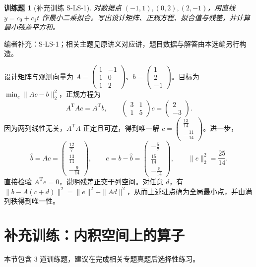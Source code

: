 \documentclass[12pt,fontset=fandol]{ctexart}
\newtheorem{exercise}{训练题}[section]
\begin{document}
\begin{exercise}[补充训练 S-LS-1]\label{prob:S-LS-1}
对数据点 $(-1,1),(0,2),(2,-1)$，用直线 $y=c_0+c_1t$ 作最小二乘拟合。写出设计矩阵、正规方程、拟合值与残差，并计算最小残差平方和。
\end{exercise}
\noindent 编者补充：S-LS-1；相关主题见原讲义对应讲，题目数据与解答由本选编另行构造。
\begin{solve}
设计矩阵与观测向量为 $A=\begin{pmatrix}1&-1\\1&0\\1&2\end{pmatrix}$、$b=\begin{pmatrix}1\\2\\-1\end{pmatrix}$。目标为 $\min_c\|Ac-b\|_2^2$，正规方程为
\[A^{\mathrm T}Ac=A^{\mathrm T}b,\qquad \begin{pmatrix}3&1\\1&5\end{pmatrix}c=\begin{pmatrix}2\\-3\end{pmatrix}.\]
因为两列线性无关，$A^{\mathrm T}A$ 正定且可逆，得到唯一解 $c=\begin{pmatrix}\frac{13}{14}\\-\frac{11}{14}\end{pmatrix}$。进一步，
\[\widehat b=Ac=\begin{pmatrix}\frac{12}{7}\\\frac{13}{14}\\-\frac{9}{14}\end{pmatrix},\qquad e=b-\widehat b=\begin{pmatrix}-\frac{5}{7}\\\frac{15}{14}\\-\frac{5}{14}\end{pmatrix},\qquad \|e\|_2^2=\frac{25}{14}.\]
直接检验 $A^{\mathrm T}e=0$，说明残差正交于列空间。对任意 $d$，有 $\|b-A(c+d)\|^2=\|e\|^2+\|Ad\|^2$，从而上述驻点确为全局最小点，并由满列秩得到唯一性。
\end{solve}

\section{补充训练：内积空间上的算子}

本节包含 3 道训练题，建议在完成相关专题真题后选择性练习。
\end{document}
